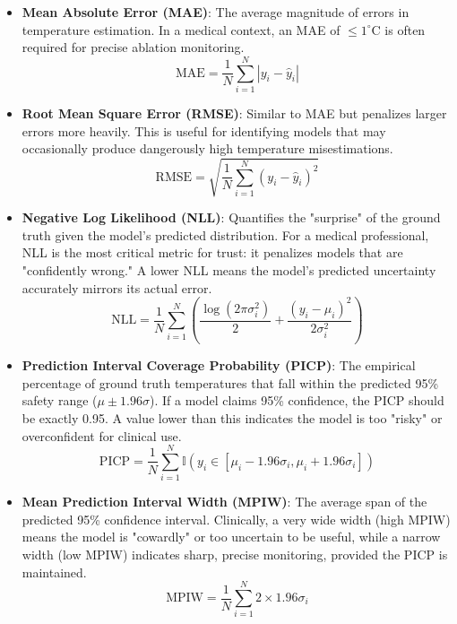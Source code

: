 \documentclass[conference]{IEEEtran}
\begin{document}
\begin{itemize}
    \item \textbf{Mean Absolute Error (MAE)}: The average magnitude of errors in temperature estimation. In a medical context, an MAE of $\le 1^\circ$C is often required for precise ablation monitoring.
    \begin{equation}
        \text{MAE} = \frac{1}{N} \sum_{i=1}^{N} |y_i - \hat{y}_i|
    \end{equation}

    \item \textbf{Root Mean Square Error (RMSE)}: Similar to MAE but penalizes larger errors more heavily. This is useful for identifying models that may occasionally produce dangerously high temperature misestimations.
    \begin{equation}
        \text{RMSE} = \sqrt{\frac{1}{N} \sum_{i=1}^{N} (y_i - \hat{y}_i)^2}
    \end{equation}

    \item \textbf{Negative Log Likelihood (NLL)}: Quantifies the "surprise" of the ground truth given the model's predicted distribution. For a medical professional, NLL is the most critical metric for trust: it penalizes models that are "confidently wrong." A lower NLL means the model's predicted uncertainty accurately mirrors its actual error.
    \begin{equation}
        \text{NLL} = \frac{1}{N} \sum_{i=1}^{N} \left( \frac{\log(2\pi\sigma_i^2)}{2} + \frac{(y_i - \mu_i)^2}{2\sigma_i^2} \right)
    \end{equation}

    \item \textbf{Prediction Interval Coverage Probability (PICP)}: The empirical percentage of ground truth temperatures that fall within the predicted 95\% safety range ($\mu \pm 1.96\sigma$). If a model claims 95\% confidence, the PICP should be exactly 0.95. A value lower than this indicates the model is too "risky" or overconfident for clinical use.
    \begin{equation}
        \text{PICP} = \frac{1}{N} \sum_{i=1}^{N} \mathbb{I}(y_i \in [\mu_i - 1.96\sigma_i, \mu_i + 1.96\sigma_i])
    \end{equation}

    \item \textbf{Mean Prediction Interval Width (MPIW)}: The average span of the predicted 95\% confidence interval. Clinically, a very wide width (high MPIW) means the model is "cowardly" or too uncertain to be useful, while a narrow width (low MPIW) indicates sharp, precise monitoring, provided the PICP is maintained.
    \begin{equation}
        \text{MPIW} = \frac{1}{N} \sum_{i=1}^{N} 2 \times 1.96\sigma_i
    \end{equation}
\end{itemize}
\end{document}
